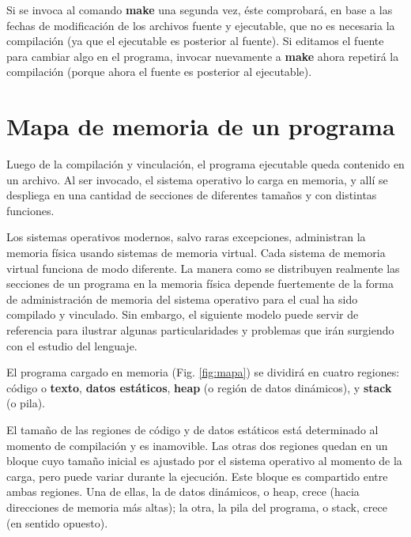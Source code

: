 Si se invoca al comando \textbf{make} una segunda vez, éste comprobará, en base a las fechas de
modificación de los archivos fuente y ejecutable, que no es necesaria la compilación (ya que el
ejecutable es posterior al fuente). Si editamos el fuente para cambiar algo en el programa, invocar
nuevamente a \textbf{make} ahora repetirá la compilación (porque ahora el fuente es posterior al ejecutable).



\section{Mapa de memoria de un programa}
Luego de la compilación y vinculación, el programa ejecutable queda contenido en un archivo. Al ser invocado, el sistema operativo lo carga en memoria, y allí se despliega en una cantidad de secciones de diferentes tamaños y con distintas funciones. 

Los sistemas operativos modernos, salvo raras excepciones, administran la memoria física  usando sistemas de memoria virtual. Cada sistema de memoria virtual funciona de modo diferente. La manera como se distribuyen realmente las secciones de un programa en la memoria física depende fuertemente de la
forma de administración de memoria del sistema operativo para el cual ha sido compilado y vinculado. Sin embargo,
el siguiente modelo puede servir de referencia para ilustrar algunas particularidades y problemas
que irán surgiendo con el estudio del lenguaje.

El programa cargado en memoria (Fig. \ref{fig:mapa}) se dividirá en cuatro regiones: código o \textbf{texto}, \textbf{datos
estáticos}, \textbf{heap} (o región de datos dinámicos), y \textbf{stack} (o pila). 

El tamaño de las regiones de código y de datos estáticos está determinado al momento de compilación
y es inamovible. Las otras dos regiones quedan en un bloque cuyo tamaño inicial es ajustado por el
sistema operativo al momento de la carga, pero puede variar durante la ejecución. Este bloque es
compartido entre ambas regiones. Una de ellas, la de datos dinámicos, o heap, crece  (hacia 
direcciones de memoria más altas); la otra, la pila del programa, o stack, crece  (en
sentido opuesto).



